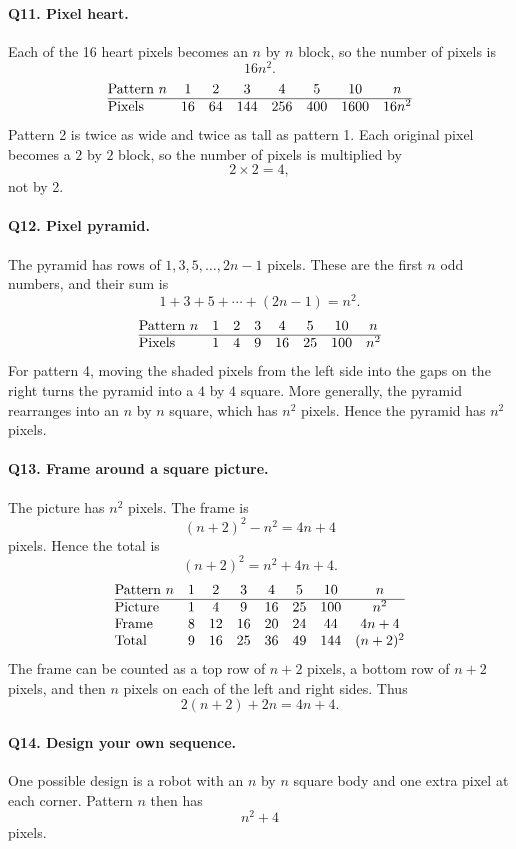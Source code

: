 \documentclass[11pt,a4paper]{article}
\begin{document}
\paragraph{Q11. Pixel heart.}
Each of the 16 heart pixels becomes an \(n\) by \(n\) block, so the number of pixels is
\[
16n^2.
\]
\[
\begin{array}{@{}lccccccc@{}}
\text{Pattern }n&1&2&3&4&5&10&n\\ \hline
\text{Pixels}&16&64&144&256&400&1600&16n^2
\end{array}
\]
Pattern 2 is twice as wide and twice as tall as pattern 1. Each original pixel becomes a \(2\) by \(2\) block, so the number of pixels is multiplied by
\[
2\times 2=4,
\]
not by 2.

\paragraph{Q12. Pixel pyramid.}
The pyramid has rows of \(1,3,5,\ldots,2n-1\) pixels. These are the first \(n\) odd numbers, and their sum is
\[
1+3+5+\cdots +(2n-1)=n^2.
\]
\[
\begin{array}{@{}lccccccc@{}}
\text{Pattern }n&1&2&3&4&5&10&n\\ \hline
\text{Pixels}&1&4&9&16&25&100&n^2
\end{array}
\]
For pattern 4, moving the shaded pixels from the left side into the gaps on the right turns the pyramid into a \(4\) by \(4\) square. More generally, the pyramid rearranges into an \(n\) by \(n\) square, which has \(n^2\) pixels. Hence the pyramid has \(n^2\) pixels.

\paragraph{Q13. Frame around a square picture.}
The picture has \(n^2\) pixels. The frame is
\[
(n+2)^2-n^2=4n+4
\]
pixels. Hence the total is
\[
(n+2)^2=n^2+4n+4.
\]
\[
\begin{array}{@{}lccccccc@{}}
\text{Pattern }n&1&2&3&4&5&10&n\\ \hline
\text{Picture}&1&4&9&16&25&100&n^2\\
\text{Frame}&8&12&16&20&24&44&4n+4\\
\text{Total}&9&16&25&36&49&144&(n+2)^2
\end{array}
\]
The frame can be counted as a top row of \(n+2\) pixels, a bottom row of \(n+2\) pixels, and then \(n\) pixels on each of the left and right sides. Thus
\[
2(n+2)+2n=4n+4.
\]

\paragraph{Q14. Design your own sequence.}
One possible design is a robot with an \(n\) by \(n\) square body and one extra pixel at each corner. Pattern \(n\) then has
\[
n^2+4
\]
pixels.
\end{document}
